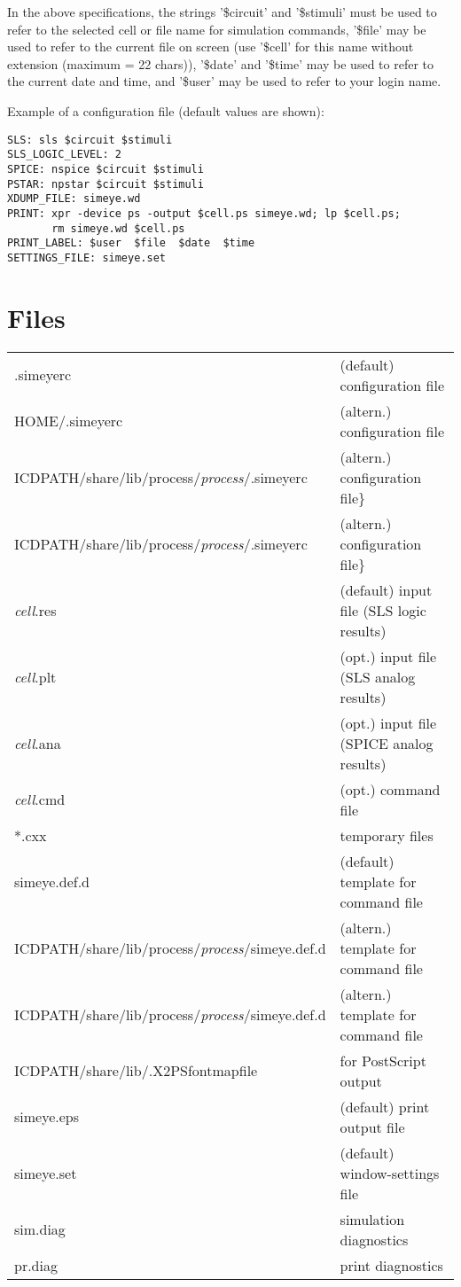 \par
In the above specifications, the strings '\$circuit' and '\$stimuli' must be
used to refer to the selected cell or file name for simulation commands,
'\$file' may be used to refer to the current file on screen
(use '\$cell' for this name without extension (maximum = 22 chars)),
'\$date' and '\$time' may be used to refer to the current date and time,
and '\$user' may be used to refer to your login name.
\par
Example of a configuration file (default values are shown):

\begin{verbatim}
SLS: sls $circuit $stimuli
SLS_LOGIC_LEVEL: 2
SPICE: nspice $circuit $stimuli
PSTAR: npstar $circuit $stimuli
XDUMP_FILE: simeye.wd
PRINT: xpr -device ps -output $cell.ps simeye.wd; lp $cell.ps;
       rm simeye.wd $cell.ps
PRINT_LABEL: $user  $file  $date  $time
SETTINGS_FILE: simeye.set
\end{verbatim}

\section{Files}

\begin{tabular}{ll}
.simeyerc & (default) configuration file\\
HOME/.simeyerc & (altern.) configuration file\\
ICDPATH/share/lib/process/{\it process}/.simeyerc & (altern.) configuration file\}\\
ICDPATH/share/lib/process/{\it process}/.simeyerc & (altern.) configuration file\}\\
{\it cell}.res & (default) input file (SLS logic results)\\
{\it cell}.plt & (opt.) input file (SLS analog results)\\
{\it cell}.ana & (opt.) input file (SPICE analog results)\\
{\it cell}.cmd & (opt.) command file\\
*.cxx & temporary files\\
simeye.def.d & (default) template for command file\\
ICDPATH/share/lib/process/{\it process}/simeye.def.d & (altern.) template for command file\\
ICDPATH/share/lib/process/{\it process}/simeye.def.d & (altern.) template for command file\\
ICDPATH/share/lib/.X2PSfontmapfile & for PostScript output\\
simeye.eps & (default) print output file\\
simeye.set & (default) window-settings file\\
sim.diag & simulation diagnostics\\
pr.diag & print diagnostics
\end{tabular}

